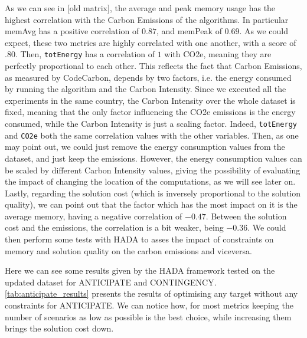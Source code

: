\documentclass[a4paper,singleside,12pt]{report} %
\begin{document}
As we can see in [old matrix], the average and peak memory usage has the highest correlation with the Carbon Emissions of the algorithms. In particular
memAvg has a positive correlation of $0.87$, and memPeak of $0.69$. As we could expect, these two metrics are highly correlated with one another, with a score of $.80$.
Then, \verb|totEnergy| has a correlation of $1$ with CO2e, meaning they are perfectly proportional to each other. This reflects the fact that Carbon Emissions, as measured
by CodeCarbon, depends by two factors, i.e. the energy consumed by running the algorithm and the Carbon Intensity. Since we executed all the experiments in the same
country, the Carbon Intensity over the whole dataset is fixed, meaning that the only factor influencing the CO2e emissions is the energy consumed, while the Carbon Intensity
is just a scaling factor. Indeed, \verb|totEnergy| and \verb|CO2e| both the same correlation values with the other variables. Then, as one may point out, we could just remove
the energy consumption values from the dataset, and just keep the emissions. However, the energy consumption values can be scaled by different Carbon Intensity values, giving
the possibility of evaluating the impact of changing the location of the computations, as we will see later on.
Lastly, regarding the solution cost (which is inversely proportional to the solution quality), we can point out that the factor which has the most impact on it is the average memory,
having a negative correlation of $-0.47$. Between the solution cost and the emissions, the correlation is a bit weaker, being $-0.36$. We could then perform some tests with HADA
to asses the impact of constraints on memory and solution quality on the carbon emissions and viceversa.

Here we can see some results given by the HADA framework tested on the updated dataset for ANTICIPATE and CONTINGENCY. \ref{tab:anticipate_results}
presents the results of optimising any target without any constraints for ANTICIPATE. We can notice how, for most metrics keeping the number of scenarios
as low as possible is the best choice, while increasing them brings the solution cost down.
\end{document}
